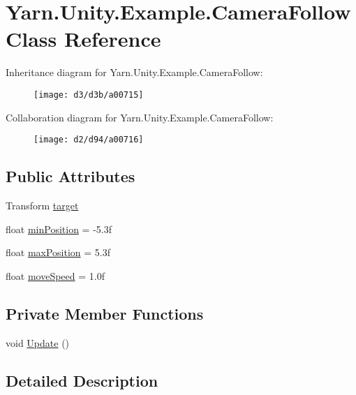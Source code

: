 \hypertarget{a00027}{\section{Yarn.\-Unity.\-Example.\-Camera\-Follow Class Reference}
\label{a00027}
}


Inheritance diagram for Yarn.\-Unity.\-Example.\-Camera\-Follow\-:
\nopagebreak
\begin{figure}[H]
\begin{center}
\leavevmode
\texttt{[image: d3/d3b/a00715]}
\end{center}
\end{figure}


Collaboration diagram for Yarn.\-Unity.\-Example.\-Camera\-Follow\-:
\nopagebreak
\begin{figure}[H]
\begin{center}
\leavevmode
\texttt{[image: d2/d94/a00716]}
\end{center}
\end{figure}
\subsection*{Public Attributes}
\begin{DoxyCompactItemize}
\item 
Transform \hyperlink{a00027_aa5d6958fb14a14ebb74e21c372fcca8b}{target}
\item 
float \hyperlink{a00027_a08c6f6c0ea423c21af99e4b5467d3c9b}{min\-Position} = -\/5.\-3f
\item 
float \hyperlink{a00027_abb0154dcbc2a7d43795beacd61a56de4}{max\-Position} = 5.\-3f
\item 
float \hyperlink{a00027_a3d4f2efe9c2cee8c7ff797cac03f27ec}{move\-Speed} = 1.\-0f
\end{DoxyCompactItemize}
\subsection*{Private Member Functions}
\begin{DoxyCompactItemize}
\item 
void \hyperlink{a00027_a592ddbf8e493bde0a6536c0234869217}{Update} ()
\end{DoxyCompactItemize}


\subsection{Detailed Description}


